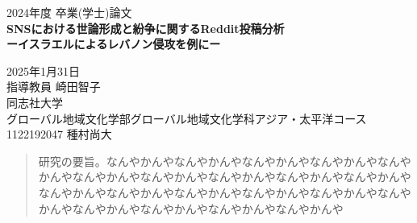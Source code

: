 \documentclass[11pt, a4j]{jreport}
\begin{document}
    \thispagestyle{empty}
    \begin{center}
        \vspace{20mm}
        {\Large\noindent 2024年度 卒業(学士)論文}\\
        \vspace{40mm}
        {\huge\noindent\textbf{SNSにおける世論形成と紛争に関するReddit投稿分析}}\\
        \medskip
        {\huge\noindent\textbf{ーイスラエルによるレバノン侵攻を例にー}}\\
        \vspace{\baselineskip}
        \vspace{40mm}

        {\Large\noindent 2025年1月31日\\ \vspace{\baselineskip} 指導教員 崎田智子 \\ \vspace{\baselineskip} 同志社大学\\ グローバル地域文化学部グローバル地域文化学科アジア・太平洋コース \\ \vspace{\baselineskip} 1122192047 種村尚大\\ }
        \vspace{40mm}
    \end{center}

    \thispagestyle{empty}
    \clearpage

    \renewcommand{\abstractname}{要旨}

    \begin{abstract}
        研究の要旨。なんやかんやなんやかんやなんやかんやなんやかんやなんやかんやなんやかんやなんやかんやなんやかんやなんやかんやなんやかんやなんやかんやなんやかんやなんやかんやなんやかんやなんやかんやなんやかんやなんやかんやなんやかんやなんやかんやなんやかんや
    \end{abstract}


    \tableofcontents

    \pagestyle{fancy}
    \lhead{\rightmark}
    \renewcommand{\chaptermark}[1]{\markboth{第\ \normalfont\thechapter\ 章~~#1}{}}
\end{document}
